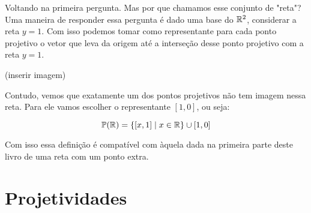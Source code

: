 Voltando na primeira pergunta. Mas por que chamamos esse conjunto de "reta"? Uma maneira de responder essa pergunta é dado uma base do $\mathbb{R}^2$, considerar a reta $y=1$. Com isso podemos tomar como representante para cada ponto projetivo o vetor que leva da origem até a interseção desse ponto projetivo com a reta $y=1$.

(inserir imagem)

Contudo, vemos que exatamente um dos pontos projetivos não tem imagem nessa reta. Para ele vamos escolher o representante $[1,0]$, ou seja:

$$\mathbb{P}(\mathbb{R})=\{[x,1]\mid x\in \mathbb{R}\}\cup {[1,0]}$$


Com isso essa definição é compatível com àquela dada na primeira parte deste livro de uma reta com um ponto extra.

\section{Projetividades}